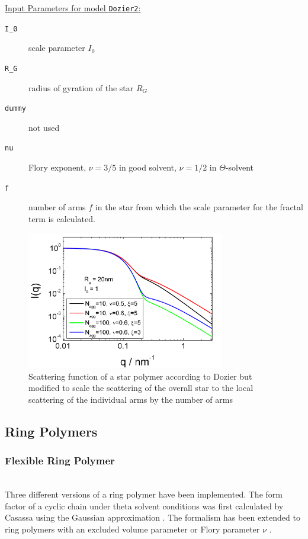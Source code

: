 \vspace{5mm}

\noindent
\uline{Input Parameters for model \texttt{Dozier2}:}
\begin{description}
\item[\texttt{I\_0}] scale parameter $I_0$
\item[\texttt{R\_G}] radius of gyration of the star $R_G$
\item[\texttt{dummy}] not used
\item[\texttt{nu}] Flory exponent, $\nu=3/5$ in good solvent, $\nu=1/2$ in $\Theta$-solvent
\item[\texttt{f}]  number of arms $f$ in the star from which the scale parameter for the fractal term is calculated.
\end{description}
\vspace{5mm}

\begin{figure}[htb]
\begin{center}
\includegraphics[width=0.768\textwidth,height=0.588\textwidth]{Dozier2_Iq.png}
\end{center}
\caption{Scattering function of a star polymer according to Dozier but modified
to scale the scattering of the overall star to the local scattering of the individual arms
by the number of arms} \label{fig:IQDozierStar2}
\end{figure}
\clearpage

\subsection{Ring Polymers}
\subsubsection{Flexible Ring Polymer }
\label{sect:FlexibleRingPolymer}
~\\
Three different versions of a ring polymer have been implemented. The form factor of a cyclic chain under theta solvent conditions was first calculated by Casassa
using the Gaussian approximation \cite{Casassa1965,Burchard1996}. The formalism has been extended to ring polymers with an excluded volume parameter or Flory parameter $\nu$ \cite{Bensafi2000,Goosen2015}.

